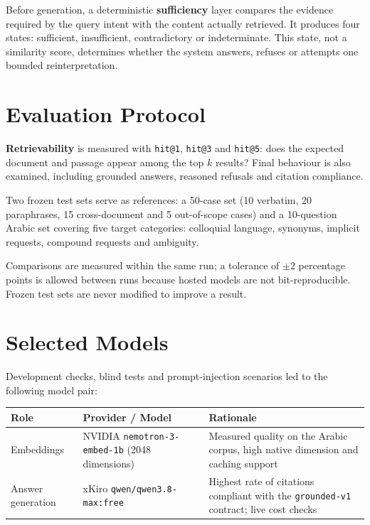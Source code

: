 \documentclass[a4paper,12pt,openany]{report}
\begin{document}
Before generation, a deterministic \textbf{sufficiency} layer compares the evidence required by the
query intent with the content actually retrieved. It produces four states: sufficient,
insufficient, contradictory or indeterminate. This state, not a similarity score, determines
whether the system answers, refuses or attempts one bounded reinterpretation.

\section{Evaluation Protocol}
\textbf{Retrievability} is measured with \texttt{hit@1}, \texttt{hit@3} and \texttt{hit@5}: does
the expected document and passage appear among the top $k$ results? Final behaviour is also
examined, including grounded answers, reasoned refusals and citation compliance.

Two frozen test sets serve as references: a 50-case set (10 verbatim, 20 paraphrases,
15 cross-document and 5 out-of-scope cases) and a 10-question Arabic set covering five target
categories: colloquial language, synonyms, implicit requests, compound requests and ambiguity.

Comparisons are measured within the same run; a tolerance of $\pm 2$ percentage points is allowed
between runs because hosted models are not bit-reproducible. Frozen test sets are never modified to
improve a result.

\section{Selected Models}
Development checks, blind tests and prompt-injection scenarios led to the following model pair:

\begin{table}[htbp]
\centering
\small
\begin{tabular}{p{2.6cm}p{5.3cm}p{6.3cm}}
\toprule
\textbf{Role} & \textbf{Provider / Model} & \textbf{Rationale} \\
\midrule
Embeddings & NVIDIA \texttt{nemotron-3-embed-1b} (2048 dimensions) & Measured quality on the
Arabic corpus, high native dimension and caching support \\
Answer generation & xKiro \texttt{qwen/qwen3.8-max:free} & Highest rate of citations compliant
with the \texttt{grounded-v1} contract; live cost checks \\
\bottomrule
\end{tabular}
\end{table}
\end{document}
